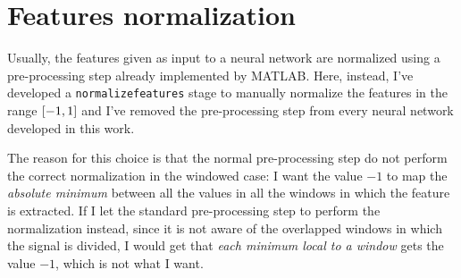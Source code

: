 \section{Features normalization}\label{sec:normalization}

Usually, the features given as input to a neural network are normalized using a
pre-processing step already implemented by MATLAB. Here, instead, I've
developed a \texttt{normalizefeatures} stage to manually normalize the features
in the range \(\interval{-1}{1}\) and I've removed the pre-processing step from
every neural network developed in this work.

The reason for this choice is that the normal pre-processing step do not
perform the correct normalization in the windowed case: I want the value \(-1\)
to map the \emph{absolute minimum} between all the values in all the windows in
which the feature is extracted. If I let the standard pre-processing step to
perform the normalization instead, since it is not aware of the overlapped
windows in which the signal is divided, I would get that \emph{each minimum
local to a window} gets the value \(-1\), which is not what I want.

